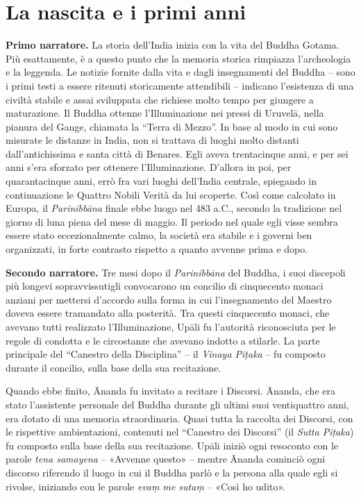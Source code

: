 \chapter{La nascita e i primi anni}

\textbf{Primo narratore.} La storia dell’India inizia con la vita del Buddha
Gotama. Più esattamente, è a questo punto che la memoria storica
rimpiazza l’archeologia e la leggenda. Le notizie fornite dalla vita e
dagli insegnamenti del Buddha – sono i primi testi a essere ritenuti
storicamente attendibili – indicano l’esistenza di una civiltà stabile e
assai sviluppata che richiese molto tempo per giungere a maturazione. Il
Buddha ottenne l’Illuminazione nei pressi di Uruvelā, nella pianura del
Gange, chiamata la “Terra di Mezzo”. In base al modo in cui sono
misurate le distanze in India, non si trattava di luoghi molto distanti
dall’antichissima e santa città di Benares. Egli aveva trentacinque
anni, e per sei anni s’era sforzato per ottenere l’Illuminazione.
D’allora in poi, per quarantacinque anni, errò fra vari luoghi
dell’India centrale, spiegando in continuazione le Quattro Nobili Verità
da lui scoperte. Così come calcolato in Europa, il \emph{Parinibbāna} finale
ebbe luogo nel 483 a.C., secondo la tradizione nel giorno di luna piena
del mese di maggio. Il periodo nel quale egli visse sembra essere stato
eccezionalmente calmo, la società era stabile e i governi ben
organizzati, in forte contrasto rispetto a quanto avvenne prima e dopo.


\textbf{Secondo narratore.} Tre mesi dopo il \emph{Parinibbāna} del Buddha, i suoi
discepoli più longevi sopravvissutigli convocarono un concilio di
cinquecento monaci anziani per mettersi d’accordo sulla forma in cui
l’insegnamento del Maestro doveva essere tramandato alla posterità. Tra
questi cinquecento monaci, che avevano tutti realizzato l’Illuminazione,
Upāli fu l’autorità riconosciuta per le regole di condotta e le
circostanze che avevano indotto a stilarle. La parte principale del
“Canestro della Disciplina” – il \emph{Vinaya Piṭaka} – fu composto durante
il concilio, sulla base della sua recitazione.


Quando ebbe finito, Ānanda fu invitato a recitare i Discorsi. Ānanda,
che era stato l’assistente personale del Buddha durante gli ultimi suoi
ventiquattro anni, era dotato di una memoria straordinaria. Quasi tutta
la raccolta dei Discorsi, con le rispettive ambientazioni, contenuti nel
“Canestro dei Discorsi” (il \emph{Sutta Piṭaka}) fu composto sulla base della
sua recitazione. Upāli iniziò ogni resoconto con le parole \emph{tena
samayena} – «Avvenne questo» – mentre Ānanda cominciò ogni discorso
riferendo il luogo in cui il Buddha parlò e la persona alla quale egli
si rivolse, iniziando con le parole \emph{evaṃ me sutaṃ} – «Così ho udito».


